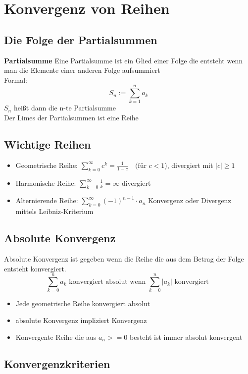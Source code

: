\documentclass[12pt,a4paper]{article}
\begin{document}
\section{Konvergenz von Reihen}
\subsection{Die Folge der Partialsummen}
\textbf{Partialsumme}
Eine Partialsumme ist ein Glied einer Folge die entsteht wenn man die Elemente einer anderen Folge aufsummiert\\
Formal: \[S_n :=\sum_{k=1}^{n}a_k\]
$S_n$ heißt dann die n-te Partialsumme\\
Der Limes der Partialsummen ist eine Reihe\\
\subsection{Wichtige Reihen}
\begin{itemize}
	\item Geometrische Reihe: $\sum_{k=0}^\infty c^k=\frac{1}{1-c}\quad\text{(für }c<1$), divergiert mit $|c|\geq 1$
	\item Harmonische Reihe: $\sum_{k=0}^\infty \frac{1}{k}=\infty$ divergiert
	\item Alternierende Reihe: $\sum_{k=0}^\infty (-1)^{n-1}\cdot a_n$ Konvergenz oder Divergenz mittels Leibniz-Kriterium
\end{itemize}

\subsection{Absolute Konvergenz}
Absolute Konvergenz ist gegeben wenn die Reihe die aus dem Betrag der Folge entsteht konvergiert.\\
\[\sum_{k=0}^n a_k \text{ konvergiert absolut wenn } \sum_{k=0}^n |a_k| \text{ konvergiert }\]
\begin{itemize}
	\item Jede geometrische Reihe konvergiert absolut
	\item absolute Konvergenz impliziert Konvergenz
	\item Konvergente Reihe die aus $a_n>=0$ besteht ist immer absolut konvergent
\end{itemize}

\subsection{Konvergenzkriterien}
\end{document}
